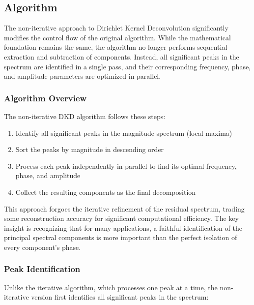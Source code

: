 \documentclass[11pt,twoside]{report}
\numberwithin{thm}{section}
\numberwithin{equation}{section}
\begin{document}
\subsection{Algorithm}

The non-iterative approach to Dirichlet Kernel Deconvolution significantly modifies the control flow of the original algorithm. While the mathematical foundation remains the same, the algorithm no longer performs sequential extraction and subtraction of components. Instead, all significant peaks in the spectrum are identified in a single pass, and their corresponding frequency, phase, and amplitude parameters are optimized in parallel.

\subsubsection{Algorithm Overview}

The non-iterative DKD algorithm follows these steps:

\begin{enumerate}
    \item Identify all significant peaks in the magnitude spectrum (local maxima)
    \item Sort the peaks by magnitude in descending order
    \item Process each peak independently in parallel to find its optimal frequency, phase, and amplitude
    \item Collect the resulting components as the final decomposition
\end{enumerate}

This approach forgoes the iterative refinement of the residual spectrum, trading some reconstruction accuracy for significant computational efficiency. The key insight is recognizing that for many applications, a faithful identification of the principal spectral components is more important than the perfect isolation of every component's phase.

\subsubsection{Peak Identification}

Unlike the iterative algorithm, which processes one peak at a time, the non-iterative version first identifies all significant peaks in the spectrum:
\end{document}
